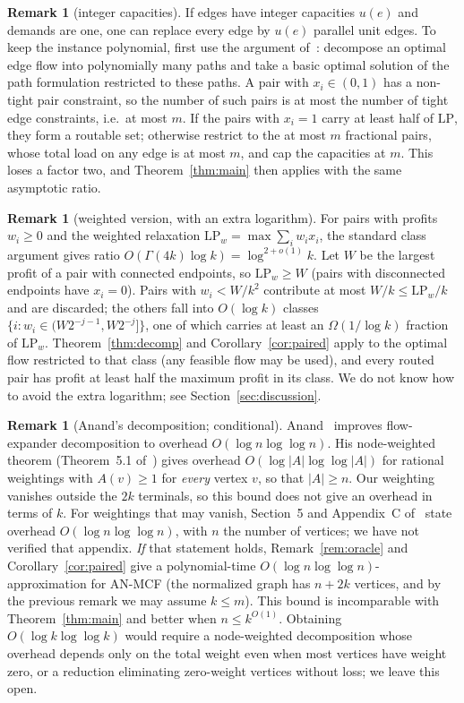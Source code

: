 \documentclass[11pt,letterpaper]{article}
\theoremstyle{definition}
\newtheorem{remark}[theorem]{Remark}
\newcommand{\LP}{\mathrm{LP}}
\begin{document}
\begin{remark}[integer capacities]
If edges have integer capacities $u(e)$ and demands are one, one can replace every edge by
$u(e)$ parallel unit edges. To keep the instance polynomial, first use the argument
of~\cite[Section~2]{CKS13}: decompose an optimal edge flow into polynomially many paths and
take a basic optimal solution of the path formulation restricted to these paths. A pair with
$x_i\in(0,1)$ has a non-tight pair constraint, so the number of such pairs is at most the
number of tight edge constraints, i.e.\ at most $m$. If the pairs with $x_i=1$ carry at least
half of $\LP$, they form a routable set; otherwise restrict to the at most $m$ fractional pairs,
whose total load on any edge is at most $m$, and cap the capacities at $m$. This loses a factor
two, and Theorem~\ref{thm:main} then applies with the same asymptotic ratio.
\end{remark}

\begin{remark}[weighted version, with an extra logarithm]\label{rem:weighted}
For pairs with profits $w_i\ge0$ and the weighted relaxation $\LP_w=\max\sum_iw_ix_i$, the
standard class argument gives ratio $O(\Gamma(4k)\log k)=\log^{2+o(1)}k$. Let $W$ be the
largest profit of a pair with connected endpoints, so $\LP_w\ge W$ (pairs with disconnected
endpoints have $x_i=0$). Pairs with $w_i<W/k^2$ contribute at most $W/k\le\LP_w/k$ and are
discarded; the others fall into $O(\log k)$ classes $\{i:w_i\in(W2^{-j-1},W2^{-j}]\}$, one of
which carries at least an $\Omega(1/\log k)$ fraction of $\LP_w$. Theorem~\ref{thm:decomp} and
Corollary~\ref{cor:paired} apply to the optimal flow restricted to that class (any feasible flow
may be used), and every routed pair has profit at least half the maximum profit in its class. We
do not know how to avoid the extra logarithm; see Section~\ref{sec:discussion}.
\end{remark}

\begin{remark}[Anand's decomposition; conditional]\label{rem:anand}
Anand~\cite{Anand26} improves flow-expander decomposition to overhead $O(\log n\log\log n)$.
His node-weighted theorem (Theorem~5.1 of~\cite{Anand26}) gives overhead
$O(\log|A|\log\log|A|)$ for rational weightings with $A(v)\ge1$ for \emph{every} vertex $v$, so
that $|A|\ge n$. Our weighting vanishes outside the $2k$ terminals, so this bound does not give
an overhead in terms of $k$. For weightings that may vanish, Section~5 and Appendix~C
of~\cite{Anand26} state overhead $O(\log n\log\log n)$, with $n$ the number of vertices; we
have not verified that appendix. \emph{If} that statement holds, Remark~\ref{rem:oracle} and
Corollary~\ref{cor:paired} give a polynomial-time $O(\log n\log\log n)$-approximation for
AN-MCF (the normalized graph has $n+2k$ vertices, and by the previous remark we may assume
$k\le m$). This bound is incomparable with Theorem~\ref{thm:main} and better when
$n\le k^{O(1)}$. Obtaining $O(\log k\log\log k)$ would require a node-weighted decomposition
whose overhead depends only on the total weight even when most vertices have weight zero, or a
reduction eliminating zero-weight vertices without loss; we leave this open.
\end{remark}
\end{document}
